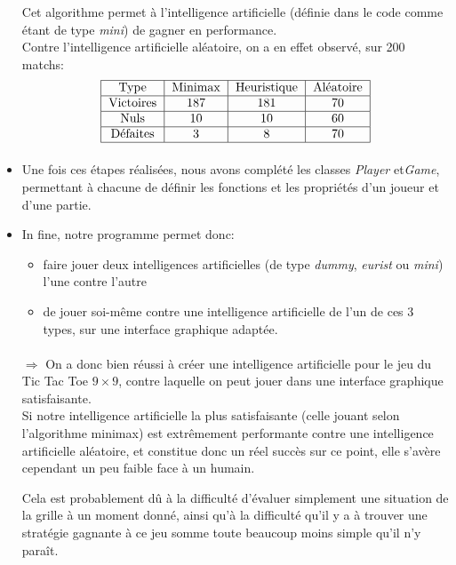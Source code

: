 \documentclass[10pt, french]{article}
\begin{document}
\begin{itemize}
Cet algorithme permet à l'intelligence artificielle (définie dans le code comme étant de type \textit{mini}) de gagner en performance. \\
Contre l'intelligence artificielle aléatoire, on a en effet observé, sur 200 matchs: 
$$
\begin{tabular}{ |c|c|c|c| }
\hline
Type & Minimax & Heuristique & Aléatoire\\
\hline
Victoires & 187 & 181 & 70 \\
\hline
Nuls & 10 & 10 & 60 \\
\hline
 Défaites & 3 & 8 & 70 \\
 \hline
\end{tabular}
$$

\paragraph{}
\item Une fois ces étapes réalisées, nous avons complété les classes \textit{Player} et\textit{Game}, permettant à chacune de définir les fonctions et les propriétés d'un joueur et d'une partie. 

\item In fine, notre programme permet donc: 
\begin{itemize}
    \item faire jouer deux intelligences artificielles (de type \textit{dummy}, \textit{eurist} ou \textit{mini}) l'une contre l'autre
    \item de jouer soi-même contre une intelligence artificielle de l'un de ces 3 types, sur une interface graphique adaptée.

\end{itemize}
\paragraph{}
$\Longrightarrow$ On a donc bien réussi à créer une intelligence artificielle pour le jeu du Tic Tac Toe $9\times9$, contre laquelle on peut jouer dans une interface graphique satisfaisante. \\
Si notre intelligence artificielle la plus satisfaisante (celle jouant selon l'algorithme minimax) est extrêmement performante contre une intelligence artificielle aléatoire, et constitue donc un réel succès sur ce point, elle s'avère cependant un peu faible face à un humain. \\
\par Cela est probablement dû à la difficulté d'évaluer simplement une situation de la grille à un moment donné, ainsi qu'à la difficulté qu'il y a à trouver une stratégie gagnante à ce jeu somme toute beaucoup moins simple qu'il n'y paraît. 



\end{itemize}
\end{document}
